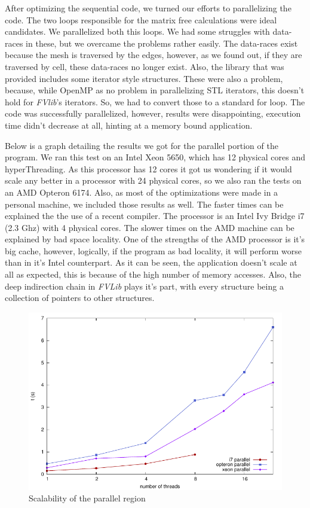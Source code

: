 \documentclass[a4paper,10pt,openright,openbib,twocolumn]{article}
\begin{document}
After optimizing the sequential code, we turned our efforts to parallelizing the code. The two loops responsible for the matrix free calculations were ideal candidates. We parallelized both this loops. We had some struggles with data-races in these, but we overcame the problems rather easily. The data-races exist because the mesh is traversed by the edges, however, as we found out, if they are traversed by cell, these data-races no longer exist. Also, the library that was provided includes some iterator style structures. These were also a problem, because, while OpenMP as no problem in parallelizing STL iterators, this doesn't hold for \emph{FVlib}'s iterators. So, we had to convert those to a standard for loop. The code was successfully parallelized, however, results were disappointing, execution time didn't decrease at all, hinting at a memory bound application.

Below is a graph detailing the results we got for the parallel portion of the program. We ran this test on an Intel Xeon 5650, which has 12 physical cores and hyperThreading. As this processor has 12 cores it got us wondering if it would scale any better in a processor with 24 physical cores, so we also ran the tests on an AMD Opteron 6174. Also, as most of the optimizations were made in a personal machine, we included those results as well. The faster times can be explained the the use of a recent compiler. The processor is an Intel Ivy Bridge i7 (2.3 Ghz) with 4 physical cores. The slower times on the AMD machine can be explained by bad space locality. One of the strengths of the AMD processor is it's big cache, however, logically, if the program as bad locality, it will perform worse than in it's Intel counterpart. 
As it can be seen, the application doesn't scale at all as expected, this is because of the high number of memory accesses. Also, the deep indirection chain in \emph{FVLib} plays it's part, with every structure being a collection of pointers to other structures.

\begin{figure}[!htb]
    \centering
    \begin{minipage}[t]{\columnwidth}
        \includegraphics[width=\textwidth]{../../../openmp/results/parallel.pdf}
        \caption{Scalability of the parallel region \label{fig:parallel}}
    \end{minipage}
\end{figure}
\end{document}
